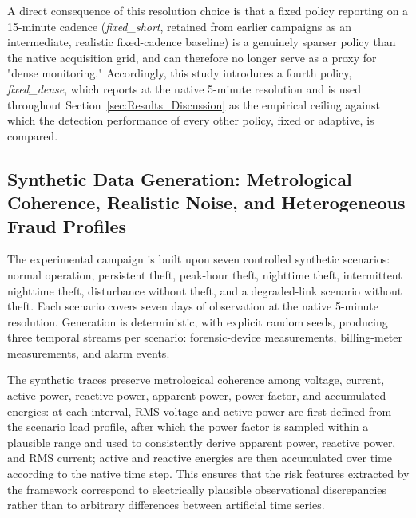\documentclass{ieeeaccess}
\begin{document}
A direct consequence of this resolution choice is that a fixed policy reporting on a 15-minute cadence (\textit{fixed\_short}, retained from earlier campaigns as an intermediate, realistic fixed-cadence baseline) is a genuinely sparser policy than the native acquisition grid, and can therefore no longer serve as a proxy for "dense monitoring." Accordingly, this study introduces a fourth policy, \textit{fixed\_dense}, which reports at the native 5-minute resolution and is used throughout Section~\ref{sec:Results_Discussion} as the empirical ceiling against which the detection performance of every other policy, fixed or adaptive, is compared.

\subsection{Synthetic Data Generation: Metrological Coherence, Realistic Noise, and Heterogeneous Fraud Profiles}
\label{subsec:synthetic_realism}
The experimental campaign is built upon seven controlled synthetic scenarios: normal operation, persistent theft, peak-hour theft, nighttime theft, intermittent nighttime theft, disturbance without theft, and a degraded-link scenario without theft. Each scenario covers seven days of observation at the native 5-minute resolution. Generation is deterministic, with explicit random seeds, producing three temporal streams per scenario: forensic-device measurements, billing-meter measurements, and alarm events.

The synthetic traces preserve metrological coherence among voltage, current, active power, reactive power, apparent power, power factor, and accumulated energies: at each interval, RMS voltage and active power are first defined from the scenario load profile, after which the power factor is sampled within a plausible range and used to consistently derive apparent power, reactive power, and RMS current; active and reactive energies are then accumulated over time according to the native time step. This ensures that the risk features extracted by the framework correspond to electrically plausible observational discrepancies rather than to arbitrary differences between artificial time series.
\end{document}
